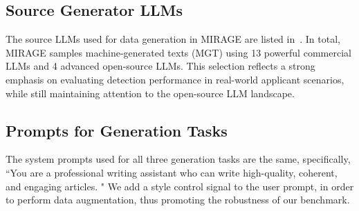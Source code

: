 \documentclass[sigconf, screen, review, anonymous]{acmart}
\begin{document}
\subsection{Source Generator LLMs}
The source LLMs used for data generation in MIRAGE are listed in~.
%
In total, MIRAGE samples machine-generated texts (MGT) using 13 powerful commercial LLMs and 4 advanced open-source LLMs.
%
This selection reflects a strong emphasis on evaluating detection performance in real-world applicant scenarios, while still maintaining attention to the open-source LLM landscape.

\begin{table}[htbp]
    \centering
    \renewcommand{\arraystretch}{1.25}
    \caption{Commercial LLMs are highlighted in \textbf{bold}.}
    \label{tab:src_models}
\end{table}


\subsection{Prompts for Generation Tasks}
The system prompts used for all three generation tasks are the same, specifically, ``You are a professional writing assistant who can write high-quality, coherent, and engaging articles. "
%
We add a style control signal to the user prompt, in order to perform data augmentation, thus promoting the robustness of our benchmark.
\end{document}
